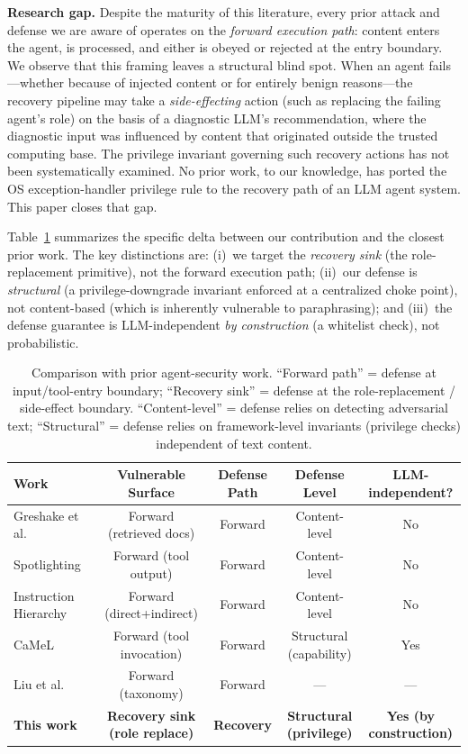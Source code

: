 \textbf{Research gap.} Despite the maturity of this literature, every prior attack and defense we are aware of operates on the \emph{forward execution path}: content enters the agent, is processed, and either is obeyed or rejected at the entry boundary. We observe that this framing leaves a structural blind spot. When an agent fails---whether because of injected content or for entirely benign reasons---the recovery pipeline may take a \emph{side-effecting} action (such as replacing the failing agent's role) on the basis of a diagnostic LLM's recommendation, where the diagnostic input was influenced by content that originated outside the trusted computing base. The privilege invariant governing such recovery actions has not been systematically examined. No prior work, to our knowledge, has ported the OS exception-handler privilege rule to the recovery path of an LLM agent system. This paper closes that gap.

Table~\ref{tab:related-comparison} summarizes the specific delta between our contribution and the closest prior work. The key distinctions are: (i)~we target the \emph{recovery sink} (the role-replacement primitive), not the forward execution path; (ii)~our defense is \emph{structural} (a privilege-downgrade invariant enforced at a centralized choke point), not content-based (which is inherently vulnerable to paraphrasing); and (iii)~the defense guarantee is LLM-independent \emph{by construction} (a whitelist check), not probabilistic.

\begin{table}[htbp]
\centering
\small
\caption{Comparison with prior agent-security work. ``Forward path'' = defense at input/tool-entry boundary; ``Recovery sink'' = defense at the role-replacement / side-effect boundary. ``Content-level'' = defense relies on detecting adversarial text; ``Structural'' = defense relies on framework-level invariants (privilege checks) independent of text content.}
\label{tab:related-comparison}
\setlength{\tabcolsep}{3pt}
\begin{tabular}{lcccc}
\toprule
\textbf{Work} & \textbf{Vulnerable Surface} & \textbf{Defense Path} & \textbf{Defense Level} & \textbf{LLM-independent?} \\
\midrule
Greshake et al.~\cite{greshake2023indirect} & Forward (retrieved docs) & Forward & Content-level & No \\
Spotlighting~\cite{spotlighting} & Forward (tool output) & Forward & Content-level & No \\
Instruction Hierarchy~\cite{instruction-hierarchy} & Forward (direct+indirect) & Forward & Content-level & No \\
CaMeL~\cite{debenedetti2025camel} & Forward (tool invocation) & Forward & Structural (capability) & Yes \\
Liu et al.~\cite{liu2024formalizing} & Forward (taxonomy) & Forward & --- & --- \\
\midrule
\textbf{This work} & \textbf{Recovery sink (role replace)} & \textbf{Recovery} & \textbf{Structural (privilege)} & \textbf{Yes (by construction)} \\
\bottomrule
\end{tabular}
\end{table}

